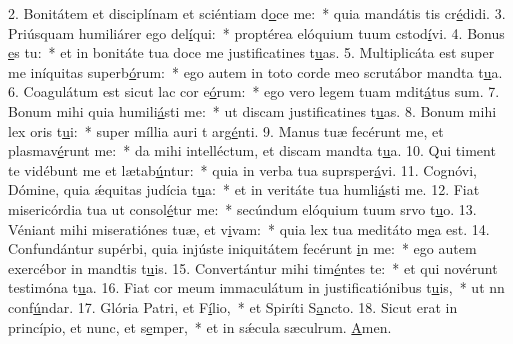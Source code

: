 2. Bonitátem et disciplínam et sciéntiam d\uline{o}ce me:~* quia mandátis tis cr\uline{é}didi.
3. Priúsquam humiliárer ego del\uline{í}qui:~* proptérea elóquium tuum cstod\uline{í}vi.
4. Bonus \uline{e}s tu:~* et in bonitáte tua doce me justificatines t\uline{u}as.
5. Multiplicáta est super me iníquitas superb\uline{ó}rum:~* ego autem in toto corde meo scrutábor mandta t\uline{u}a.
6. Coagulátum est sicut lac cor e\uline{ó}rum:~* ego vero legem tuam mdit\uline{á}tus sum.
7. Bonum mihi quia humili\uline{á}sti me:~* ut discam justificatines t\uline{u}as.
8. Bonum mihi lex oris t\uline{u}i:~* super míllia auri t arg\uline{é}nti.
9. Manus tuæ fecérunt me, et plasmav\uline{é}runt me:~* da mihi intelléctum, et discam mandta t\uline{u}a.
10. Qui timent te vidébunt me et lætab\uline{ú}ntur:~* quia in verba tua suprsper\uline{á}vi.
11. Cognóvi, Dómine, quia ǽquitas judícia t\uline{u}a:~* et in veritáte tua humli\uline{á}sti me.
12. Fiat misericórdia tua ut consol\uline{é}tur me:~* secúndum elóquium tuum srvo t\uline{u}o.
13. Véniant mihi miseratiónes tuæ, et v\uline{i}vam:~* quia lex tua meditáto m\uline{e}a est.
14. Confundántur supérbi, quia injúste iniquitátem fecérunt \uline{i}n me:~* ego autem exercébor in mandtis t\uline{u}is.
15. Convertántur mihi tim\uline{é}ntes te:~* et qui novérunt testimóna t\uline{u}a.
16. Fiat cor meum immaculátum in justificatiónibus t\uline{u}is,~* ut nn conf\uline{ú}ndar.
17. Glória Patri, et F\uline{í}lio,~* et Spiríti S\uline{a}ncto.
18. Sicut erat in princípio, et nunc, et s\uline{e}mper,~* et in sǽcula sæculrum. \uline{A}men.
